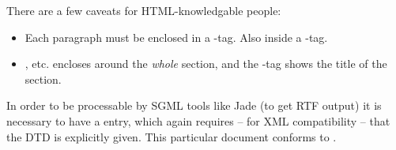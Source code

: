 There are a few caveats for HTML-knowledgable people:

\begin{itemize}
\item Each paragraph must be enclosed in a -tag.  Also
  inside a -tag.
\item {},  etc. encloses around the \textit{whole} section, and the
  -tag shows the title of the section.
\end{itemize}  
In order to be processable by SGML tools like Jade (to get RTF output)
it is necessary to have a  entry, which again requires
-- for XML compatibility -- that the DTD is explicitly given.  This
particular document conforms to
.




